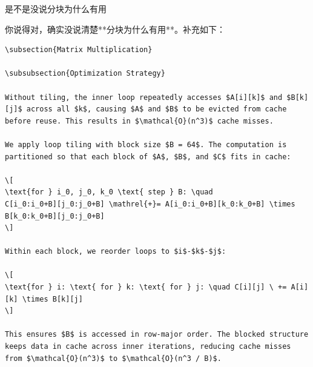 \documentclass[11pt, a4paper]{article}
\begin{document}
\begin{userbox}
是不是没说分块为什么有用

你说得对，确实没说清楚**分块为什么有用**。补充如下：

\begin{verbatim}
\subsection{Matrix Multiplication}

\subsubsection{Optimization Strategy}

Without tiling, the inner loop repeatedly accesses $A[i][k]$ and $B[k][j]$ across all $k$, causing $A$ and $B$ to be evicted from cache before reuse. This results in $\mathcal{O}(n^3)$ cache misses.

We apply loop tiling with block size $B = 64$. The computation is partitioned so that each block of $A$, $B$, and $C$ fits in cache:

\[
\text{for } i_0, j_0, k_0 \text{ step } B: \quad
C[i_0:i_0+B][j_0:j_0+B] \mathrel{+}= A[i_0:i_0+B][k_0:k_0+B] \times B[k_0:k_0+B][j_0:j_0+B]
\]

Within each block, we reorder loops to $i$-$k$-$j$:

\[
\text{for } i: \text{ for } k: \text{ for } j: \quad C[i][j] \ += A[i][k] \times B[k][j]
\]

This ensures $B$ is accessed in row-major order. The blocked structure keeps data in cache across inner iterations, reducing cache misses from $\mathcal{O}(n^3)$ to $\mathcal{O}(n^3 / B)$.
\end{verbatim}
\end{userbox}
\end{document}

